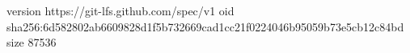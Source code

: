 version https://git-lfs.github.com/spec/v1
oid sha256:6d582802ab6609828d1f5b732669cad1cc21f0224046b95059b73e5cb12c84bd
size 87536
